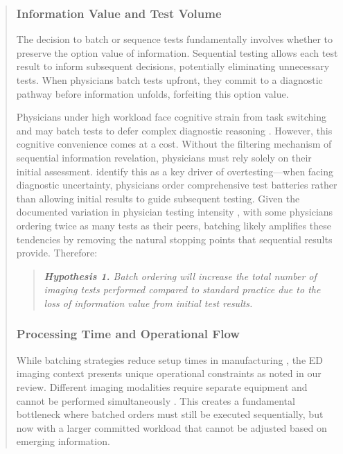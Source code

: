 \documentclass[11pt]{article}
\newcommand{\1}{\hbox{\rm 1\kern-.35em 1}}
\begin{document}
{\begin{quote}
\subsubsection*{Information Value and Test Volume}

The decision to batch or sequence tests fundamentally involves whether to preserve the option value of information. Sequential testing allows each test result to inform subsequent decisions, potentially eliminating unnecessary tests. When physicians batch tests upfront, they commit to a diagnostic pathway before information unfolds, forfeiting this option value.

Physicians under high workload face cognitive strain from task switching and may batch tests to defer complex diagnostic reasoning \cite{kc2013does, skaugset2016can}. However, this cognitive convenience comes at a cost. Without the filtering mechanism of sequential information revelation, physicians must rely solely on their initial assessment. \cite{lam2020why} identify this as a key driver of overtesting---when facing diagnostic uncertainty, physicians order comprehensive test batteries rather than allowing initial results to guide subsequent testing. Given the documented variation in physician testing intensity \cite{hodgson2018are}, with some physicians ordering twice as many tests as their peers, batching likely amplifies these tendencies by removing the natural stopping points that sequential results provide. Therefore:

\begin{quote}
\small
\textit{\textbf{Hypothesis 1.} Batch ordering will increase the total number of imaging tests performed compared to standard practice due to the loss of information value from initial test results.}
\end{quote}

\subsubsection*{Processing Time and Operational Flow}

While batching strategies reduce setup times in manufacturing \cite{Fowler2022}, the ED imaging context presents unique operational constraints as noted in our review. Different imaging modalities require separate equipment and cannot be performed simultaneously \cite{Jessome2020}. This creates a fundamental bottleneck where batched orders must still be executed sequentially, but now with a larger committed workload that cannot be adjusted based on emerging information.


\end{quote}}
\end{document}
